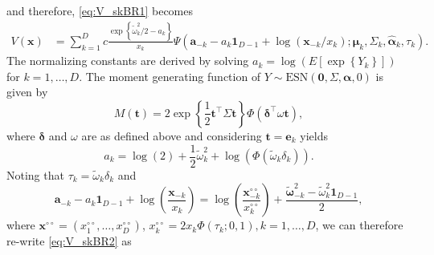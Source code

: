 \documentclass[lineno]{biometrika}
\begin{document}
and therefore, \eqref{eq:V_skBR1} becomes
%
\begin{align}
\label{eq:V_skBR2}
V(\bm x) &= \sum_{k=1}^D c \frac{\exp\left\{\tilde{\omega}_k^2/2-a_k\right\}}{x_k}
\Psi \left( \bm a_{-k}-a_{k} \bm 1_{D-1}+\log(\bm x_{-k}/x_k) ; \bm \mu_k, \Sigma_k, \hat{\bm \alpha}_k, \tau_k\right).
\end{align}
% 
The normalizing constants are derived by solving $a_k = \log\left( E \left[ \exp \left\{ Y_k\right\}\right]\right)$ for $k=1, \ldots, D$. The moment generating function of $Y \sim \text{ESN}(\bm 0, \Sigma, \bm \alpha, 0)$ is given by
%
$$
M(\bm t)  = 2 \exp \left\{ \frac{1}{2} \bm t^\top \Sigma \bm t \right\} \Phi\left( \bm \delta^\top \omega \bm t\right),
$$
%
where $\bm \delta$ and $\omega$ are as defined above and considering $\bm t = \bm e_k$ yields 
%
$$
a_k = \log(2) + \frac{1}{2} \tilde{\omega}_k^2 + \log \left( \Phi\left( \tilde{\omega}_{k} \delta_k \right)\right).
$$
Noting that $\tau_k = \tilde{\omega}_k \delta_k$ and
%
$$
\bm a_{-k}-a_{k} \bm 1_{D-1}+\log \left(\frac{\bm x_{-k}}{x_k}\right)
= \log \left( \frac{\bm x^{\circ\circ}_{-k}}{x^{\circ\circ}_k} \right) + \frac{\tilde{\bm \omega}_{-k}^2 - \tilde{\omega}_k^2\bm 1_{D-1}}{2},
$$
where $\bm x^{\circ\circ} = \left( x^{\circ\circ}_1, \ldots, x^{\circ\circ}_D\right)$, $x^{\circ\circ}_k = 2x_k \Phi\left( \tau_k; 0, 1 \right), k=1, \ldots, D$,
we can therefore re-write \eqref{eq:V_skBR2} as
%
\end{document}
